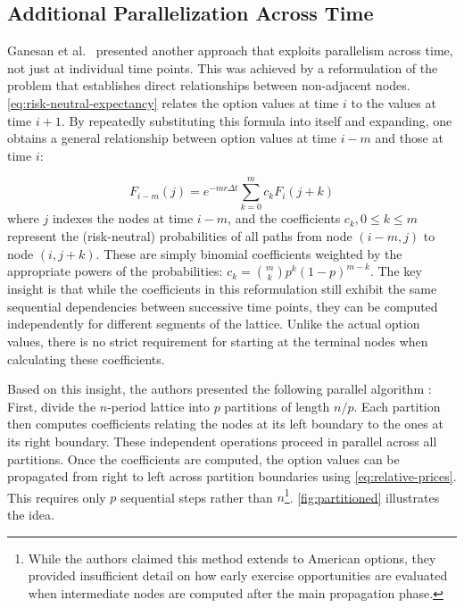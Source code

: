 \documentclass[english,12pt,a4paper,pdftex,sci,utf8]{aaltothesis}
\begin{document}
\subsection{Additional Parallelization Across Time}
Ganesan et al.\ \cite{ganesan2009acceleration} presented another approach that exploits parallelism across time, not just at individual time points. This was achieved by a reformulation of the problem that establishes direct relationships between non-adjacent nodes. \cref{eq:risk-neutral-expectancy} relates the option values at time $i$ to the values at time $i+1$. By repeatedly substituting this formula into itself and expanding, one obtains a general relationship between option values at time $i-m$ and those at time $i$:

\begin{equation}
    F_{i-m}(j) = e^{-m r \Delta t} \sum_{k=0}^m c_k F_i(j+k)
\label{eq:relative-prices}
\end{equation}
where $j$ indexes the nodes at time $i-m$, and the coefficients $c_k, 0 \leq k \leq m$ represent the (risk-neutral) probabilities of all paths from node $(i-m,j)$ to node $(i,j+k)$. These are simply binomial coefficients weighted by the appropriate powers of the probabilities: $c_k = \binom{m}{k}p^k(1-p)^{m-k}$. The key insight is that while the coefficients in this reformulation still exhibit the same sequential dependencies between successive time points, they can be computed independently for different segments of the lattice. Unlike the actual option values, there is no strict requirement for starting at the terminal nodes when calculating these coefficients.

Based on this insight, the authors presented the following parallel algorithm \cite{ganesan2009acceleration}: First, divide the $n$-period lattice into $p$ partitions of length $n/p$. Each partition then computes coefficients relating the nodes at its left boundary to the ones at its right boundary. These independent operations proceed in parallel across all partitions. Once the coefficients are computed, the option values can be propagated from right to left across partition boundaries using \cref{eq:relative-prices}. This requires only $p$ sequential steps rather than $n$\footnote{While the authors claimed this method extends to American options, they provided insufficient detail on how early exercise opportunities are evaluated when intermediate nodes are computed after the main propagation phase.}. \cref{fig:partitioned} illustrates the idea.
\end{document}
